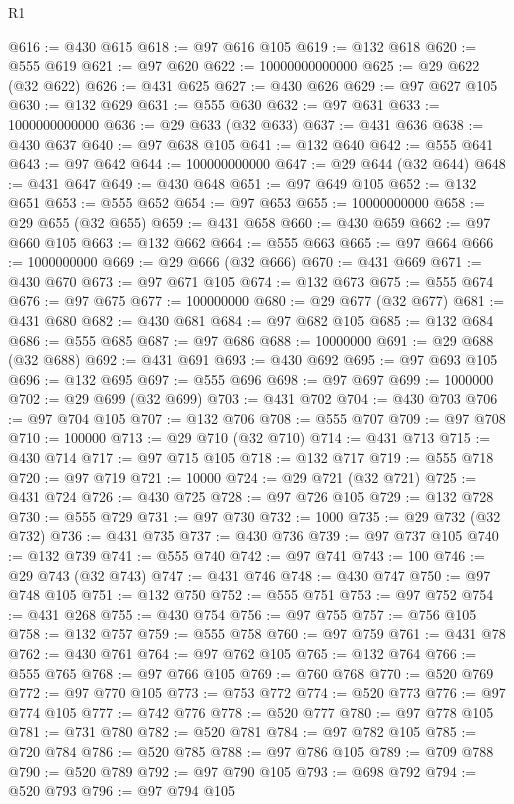 \begin{lexlean}{R1}
\begin{coremodule}
{{{{{{{{{{{{{{{{{{{{{{{{{{{{{{{{{{{{{{{{{{{{{{{{{{{{{{{{{{{{{{{{{{{{{{{{{{{{{{{{{{{{{{{{{{{{{{{{{{{{{{{{{{{{{{{{{{{{{{{{{{{{{{{{{{{{{{{{{{{{{{{{{{{{{{{{{{{{{{{{{{{{{{{{{{{{{{{{{{{{{{{{{{@616 := @430 @615
@618 := @97 @616 @105
@619 := @132 @618
@620 := @555 @619
@621 := @97 @620
@622 := 10000000000000
@625 := @29 @622 (@32 @622)
@626 := @431 @625
@627 := @430 @626
@629 := @97 @627 @105
@630 := @132 @629
@631 := @555 @630
@632 := @97 @631
@633 := 1000000000000
@636 := @29 @633 (@32 @633)
@637 := @431 @636
@638 := @430 @637
@640 := @97 @638 @105
@641 := @132 @640
@642 := @555 @641
@643 := @97 @642
@644 := 100000000000
@647 := @29 @644 (@32 @644)
@648 := @431 @647
@649 := @430 @648
@651 := @97 @649 @105
@652 := @132 @651
@653 := @555 @652
@654 := @97 @653
@655 := 10000000000
@658 := @29 @655 (@32 @655)
@659 := @431 @658
@660 := @430 @659
@662 := @97 @660 @105
@663 := @132 @662
@664 := @555 @663
@665 := @97 @664
@666 := 1000000000
@669 := @29 @666 (@32 @666)
@670 := @431 @669
@671 := @430 @670
@673 := @97 @671 @105
@674 := @132 @673
@675 := @555 @674
@676 := @97 @675
@677 := 100000000
@680 := @29 @677 (@32 @677)
@681 := @431 @680
@682 := @430 @681
@684 := @97 @682 @105
@685 := @132 @684
@686 := @555 @685
@687 := @97 @686
@688 := 10000000
@691 := @29 @688 (@32 @688)
@692 := @431 @691
@693 := @430 @692
@695 := @97 @693 @105
@696 := @132 @695
@697 := @555 @696
@698 := @97 @697
@699 := 1000000
@702 := @29 @699 (@32 @699)
@703 := @431 @702
@704 := @430 @703
@706 := @97 @704 @105
@707 := @132 @706
@708 := @555 @707
@709 := @97 @708
@710 := 100000
@713 := @29 @710 (@32 @710)
@714 := @431 @713
@715 := @430 @714
@717 := @97 @715 @105
@718 := @132 @717
@719 := @555 @718
@720 := @97 @719
@721 := 10000
@724 := @29 @721 (@32 @721)
@725 := @431 @724
@726 := @430 @725
@728 := @97 @726 @105
@729 := @132 @728
@730 := @555 @729
@731 := @97 @730
@732 := 1000
@735 := @29 @732 (@32 @732)
@736 := @431 @735
@737 := @430 @736
@739 := @97 @737 @105
@740 := @132 @739
@741 := @555 @740
@742 := @97 @741
@743 := 100
@746 := @29 @743 (@32 @743)
@747 := @431 @746
@748 := @430 @747
@750 := @97 @748 @105
@751 := @132 @750
@752 := @555 @751
@753 := @97 @752
@754 := @431 @268
@755 := @430 @754
@756 := @97 @755
@757 := @756 @105
@758 := @132 @757
@759 := @555 @758
@760 := @97 @759
@761 := @431 @78
@762 := @430 @761
@764 := @97 @762 @105
@765 := @132 @764
@766 := @555 @765
@768 := @97 @766 @105
@769 := @760 @768
@770 := @520 @769
@772 := @97 @770 @105
@773 := @753 @772
@774 := @520 @773
@776 := @97 @774 @105
@777 := @742 @776
@778 := @520 @777
@780 := @97 @778 @105
@781 := @731 @780
@782 := @520 @781
@784 := @97 @782 @105
@785 := @720 @784
@786 := @520 @785
@788 := @97 @786 @105
@789 := @709 @788
@790 := @520 @789
@792 := @97 @790 @105
@793 := @698 @792
@794 := @520 @793
@796 := @97 @794 @105
}}}}}}}}}}}}}}}}}}}}}}}}}}}}}}}}}}}}}}}}}}}}}}}}}}}}}}}}}}}}}}}}}}}}}}}}}}}}}}}}}}}}}}}}}}}}}}}}}}}}}}}}}}}}}}}}}}}}}}}}}}}}}}}}}}}}}}}}}}}}}}}}}}}}}}}}}}}}}}}}}}}}}}}}}}}}}}}}}}}}}}}}}}
\end{coremodule}
\end{lexlean}
